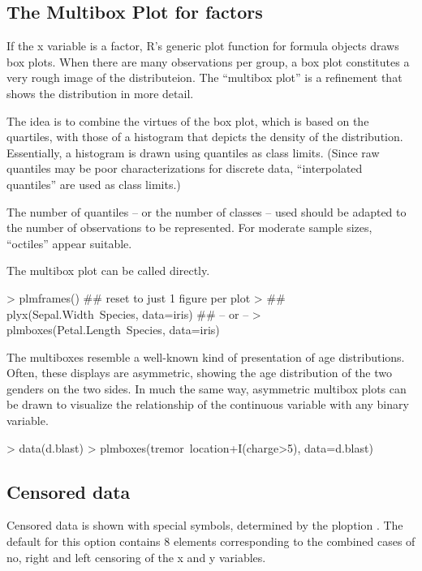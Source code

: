 \documentclass[11pt]{article}
\begin{document}
\subsection{The Multibox Plot for factors}
If the x variable is a factor, R's generic plot function for formula objects
draws box plots.
When there are many observations per group, a box plot constitutes a 
very rough image of the distributeion.
The ``multibox plot'' is a refinement that shows the distribution in more
detail. 

The idea is to combine the virtues of the box plot, which is based on the
quartiles, with those of a histogram that depicts the density of the
distribution. 
Essentially, a histogram is drawn using quantiles as class limits.
(Since raw quantiles may be poor characterizations for discrete data,
``interpolated quantiles'' are used as class limits.)

The number of quantiles -- or the number of classes -- used should be
adapted to the number of observations to be represented.
For moderate sample sizes, ``octiles'' appear suitable.

The multibox plot can be called directly.
\begin{Schunk}
\begin{Sinput}
> plmframes()  ## reset to just 1 figure per plot
> ## plyx(Sepal.Width~Species, data=iris)  ## -- or --
> plmboxes(Petal.Length~Species, data=iris)
\end{Sinput}
\end{Schunk}

The multiboxes %
resemble a well-known kind of
presentation of age distributions. Often, these displays are asymmetric,
showing the age distribution of the two genders on the two sides.
In much the same way, asymmetric multibox plots can be drawn to visualize
the relationship of the continuous variable with any binary variable.
\begin{Schunk}
\begin{Sinput}
> data(d.blast)
> plmboxes(tremor~location+I(charge>5), data=d.blast)
\end{Sinput}
\end{Schunk}

\subsection{Censored data}
Censored data is shown with special symbols, determined by the ploption
\linebreak[3]
. The default for this option contains 8 elements
corresponding to the combined cases of no, right and left censoring of 
the x and y variables.
\end{document}

